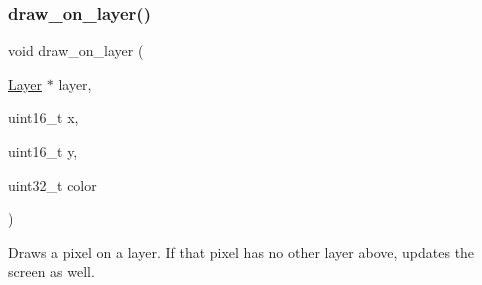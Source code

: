 \mbox{\label{group__layer_ga04dfe9a97af5089a6b5a5a044d8d7e9c}} 
\subsubsection{\texorpdfstring{draw\+\_\+on\+\_\+layer()}{draw\_on\_layer()}}
{\footnotesize\ttfamily void draw\+\_\+on\+\_\+layer (\begin{DoxyParamCaption}\item[{\mbox{\hyperlink{struct_layer}{Layer}} $\ast$}]{layer,  }\item[{uint16\+\_\+t}]{x,  }\item[{uint16\+\_\+t}]{y,  }\item[{uint32\+\_\+t}]{color }\end{DoxyParamCaption})}



Draws a pixel on a layer. If that pixel has no other layer above, updates the screen as well. 


